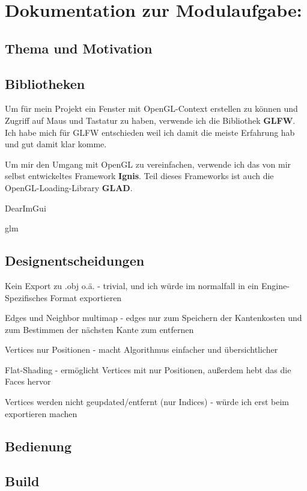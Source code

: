 \documentclass[a4paper,12pt]{book}
\begin{document}
\chapter*{Dokumentation zur Modulaufgabe:}

\section*{Thema und Motivation}

\section*{Bibliotheken}

Um für mein Projekt ein Fenster mit OpenGL-Context erstellen zu können und Zugriff auf Maus und Tastatur zu haben, verwende ich die Bibliothek \textbf{GLFW}. Ich habe mich für GLFW entschieden weil ich damit die meiste Erfahrung hab und gut damit klar komme.

Um mir den Umgang mit OpenGL zu vereinfachen, verwende ich das von mir selbst entwickeltes Framework \textbf{Ignis}. Teil dieses Frameworks ist auch die OpenGL-Loading-Library \textbf{GLAD}.

DearImGui

glm

\section*{Designentscheidungen}

Kein Export zu .obj o.ä. - trivial, und ich würde im normalfall in ein Engine-Spezifisches Format exportieren

Edges und Neighbor multimap - edges nur zum Speichern der Kantenkosten und zum Bestimmen der nächsten Kante zum entfernen

Vertices nur Positionen - macht Algorithmus einfacher und übersichtlicher

Flat-Shading - ermöglicht Vertices mit nur Positionen, außerdem hebt das die Faces hervor

Vertices werden nicht geupdated/entfernt (nur Indices) - würde ich erst beim exportieren machen

\section*{Bedienung}

\section*{Build}
\end{document}

